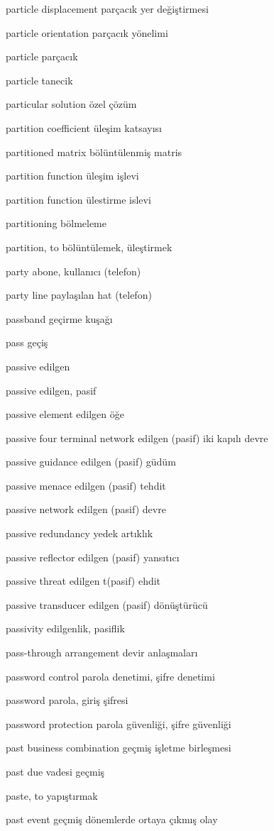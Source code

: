 \documentclass[12pt,fleqn]{article}\usepackage{../../common}
\begin{document}
particle displacement parçacık yer değiştirmesi

particle orientation parçacık yönelimi

particle parçacık

particle tanecik

particular solution özel çözüm

partition coefficient üleşim katsayısı

partitioned matrix bölüntülenmiş matris

partition function üleşim işlevi

partition function ülestirme islevi

partitioning bölmeleme

partition, to bölüntülemek, üleştirmek

party abone, kullanıcı (telefon)

party line paylaşılan hat (telefon)

passband geçirme kuşağı

pass geçiş

passive edilgen

passive edilgen, pasif

passive element edilgen öğe

passive four terminal network edilgen (pasif) iki kapılı devre

passive guidance edilgen (pasif) güdüm

passive menace edilgen (pasif) tehdit

passive network edilgen (pasif) devre

passive redundancy yedek artıklık

passive reflector edilgen (pasif) yansıtıcı

passive threat edilgen t(pasif) ehdit

passive transducer edilgen (pasif) dönüştürücü

passivity edilgenlik, pasiflik

pass-through arrangement devir anlaşmaları

password control parola denetimi, şifre denetimi

password parola, giriş şifresi

password protection parola güvenliği, şifre güvenliği

past business combination geçmiş işletme birleşmesi

past due vadesi geçmiş

paste, to yapıştırmak

past event geçmiş dönemlerde ortaya çıkmış olay
\end{document}
